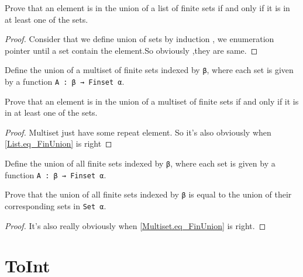 \begin{lemma}\label{List.eq_FinUnion}
  \leanok
  Prove that an element is in the union of a list of finite sets if and only if it is in at least one of the sets.
\end{lemma}

\begin{proof}
  \leanok
  Consider that we define union of sets by induction , we enumeration pointer until a set contain the element.So obviously ,they are same.
\end{proof}

\begin{definition}\label{Multiset.FinUnion}
  \leanok
  Define the union of a multiset of finite sets indexed by \verb|β|, where each set is given by a function \verb|A : β → Finset α|.
\end{definition}

\begin{lemma}\label{Multiset.eq_FinUnion}
  \leanok
  Prove that an element is in the union of a multiset of finite sets if and only if it is in at least one of the sets.
\end{lemma}

\begin{proof}
  \leanok
  Multiset just have some repeat element. So it's also obviously when \ref{List.eq_FinUnion} is right
\end{proof}

\begin{definition}\label{FinUnion₀}
  \leanok
  Define the union of all finite sets indexed by \verb|β|, where each set is given by a function \verb|A : β → Finset α|.
\end{definition}

\begin{lemma}\label{eq_FinUnion₀}
  \leanok
  Prove that the union of all finite sets indexed by \verb|β| is equal to the union of their corresponding sets in \verb|Set α|.
\end{lemma}

\begin{proof}
    \leanok
    It's also really obviously when \ref{Multiset.eq_FinUnion} is right.
\end{proof}
\section{ToInt}

